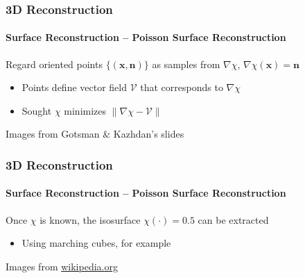 \documentclass[xetex,professionalfont]{beamer}
\renewcommand{\vec}[1]{\ensuremath{\mathbf{#1}}}
\newcommand{\vx}{\vec{x}}
\newcommand{\vn}{\vec{n}}
\begin{document}

\begin{frame}
\frametitle{3D Reconstruction}
\framesubtitle{Surface Reconstruction -- Poisson Surface Reconstruction}

Regard oriented points $\{(\vx,\vn)\}$ as samples from $\nabla\chi$, $\nabla\chi(\vx)=\vn$ %
\begin{itemize}
    \item Points define vector field $\mathcal{V}$ that corresponds to $\nabla\chi$ %
    \item Sought $\chi$ minimizes $\lVert\nabla\chi-\mathcal{V}\rVert$ %
\end{itemize}

\bigskip
\begin{center}
    {\centering Images from Gotsman \& Kazhdan's slides}
\end{center}

\end{frame}


\begin{frame}
\frametitle{3D Reconstruction}
\framesubtitle{Surface Reconstruction -- Poisson Surface Reconstruction}

Once $\chi$ is known, the isosurface $\chi(\cdot)=0.5$ can be extracted
\begin{itemize}
    \item Using marching cubes, for example
\end{itemize}

\bigskip
\begin{center}
    {\centering Images from \url{wikipedia.org}}
\end{center}

\end{frame}
\end{document}
